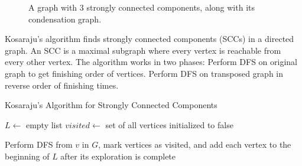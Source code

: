 \begin{figure}[H]
\begin{subfigure}[b]{0.44\textwidth}
      \caption{}
      \label{fig:}
    \end{subfigure}
    \caption{A graph with 3 strongly connected components, along with its condensation graph. } 
    \label{fig:scc_condensation}
  \end{figure}

  \begin{algo}
    Kosaraju's algorithm finds strongly connected components (SCCs) in a directed graph.
    An SCC is a maximal subgraph where every vertex is reachable from every other vertex.
    The algorithm works in two phases: Perform DFS on original graph to get finishing order of vertices. Perform DFS on transposed graph in reverse order of finishing times. 
    \begin{algorithm}[H]
    \caption{Kosaraju's Algorithm for Strongly Connected Components}
    \label{alg:kosaraju}
    \begin{algorithmic}[1]
    
        
        \State $L \gets $ empty list 
        \State $visited \gets $ set of all vertices initialized to false 
        
         
           
            \State Perform DFS from $v$ in $G$, mark vertices as visited, and add each vertex to the beginning of $L$ after its exploration is complete 
          \EndIf
        \EndFor
        

\end{algorithmic}
\end{algorithm}
\end{algo}

